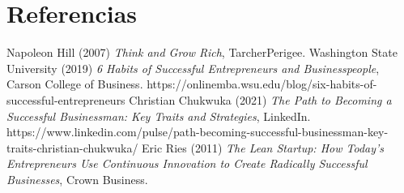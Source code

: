 \documentclass{article}
\begin{document}
\section{Referencias}
\begin{thebibliography}{1}
Napoleon Hill (2007) \emph{Think and Grow Rich}, TarcherPerigee.
Washington State University (2019) \emph{6 Habits of Successful Entrepreneurs and Businesspeople}, Carson College of Business.
\color{blue}https://onlinemba.wsu.edu/blog/six-habits-of-successful-entrepreneurs
\color{black}
Christian Chukwuka (2021) \emph{The Path to Becoming a Successful Businessman: Key Traits and Strategies}, LinkedIn.
\color{blue}https://www.linkedin.com/pulse/path-becoming-successful-businessman-key-traits-christian-chukwuka/
\color{black}
Eric Ries (2011) \emph{The Lean Startup: How Today's Entrepreneurs Use Continuous Innovation to Create Radically Successful Businesses}, Crown Business.
\end{thebibliography}
\end{document}
